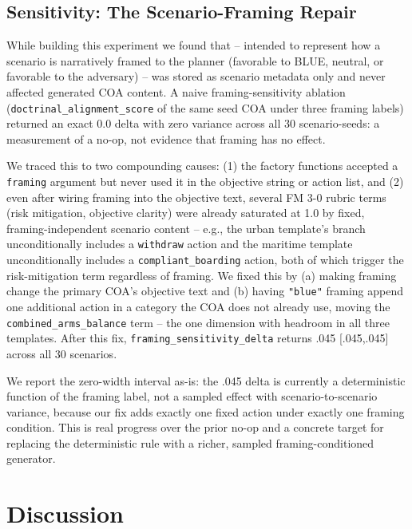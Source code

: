 \documentclass[letterpaper]{article} %
\begin{document}
\subsection{Sensitivity: The Scenario-Framing Repair}
\label{sec:framing}

While building this experiment we found that  -- intended to represent how a scenario is narratively framed to the planner (favorable to BLUE, neutral, or favorable to the adversary) -- was stored as scenario metadata only and never affected generated COA content. A naive framing-sensitivity ablation (\texttt{doctrinal\_alignment\_score} of the same seed COA under three framing labels) returned an exact 0.0 delta with zero variance across all 30 scenario-seeds: a measurement of a no-op, not evidence that framing has no effect.

We traced this to two compounding causes: (1) the factory functions accepted a \texttt{framing} argument but never used it in the objective string or action list, and (2) even after wiring framing into the objective text, several FM 3-0 rubric terms (risk mitigation, objective clarity) were already saturated at 1.0 by fixed, framing-independent scenario content -- e.g., the urban template's branch unconditionally includes a \texttt{withdraw} action and the maritime template unconditionally includes a \texttt{compliant\_boarding} action, both of which trigger the risk-mitigation term regardless of framing. We fixed this by (a) making framing change the primary COA's objective text and (b) having \texttt{"blue"} framing append one additional action in a category the COA does not already use, moving the \texttt{combined\_arms\_balance} term -- the one dimension with headroom in all three templates. After this fix, \texttt{framing\_sensitivity\_delta} returns .045 [.045,.045] across all 30 scenarios.

We report the zero-width interval as-is: the .045 delta is currently a deterministic function of the framing label, not a sampled effect with scenario-to-scenario variance, because our fix adds exactly one fixed action under exactly one framing condition. This is real progress over the prior no-op and a concrete target for replacing the deterministic rule with a richer, sampled framing-conditioned generator.

\section{Discussion}
\end{document}
